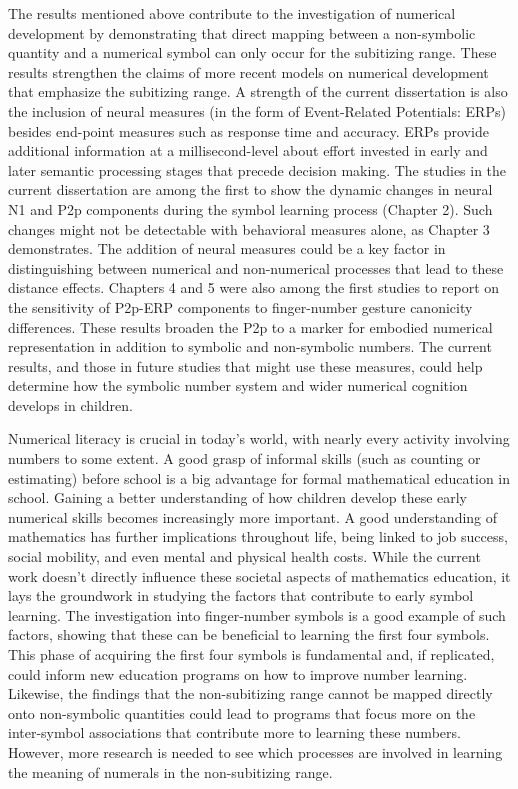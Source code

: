 \begin{refsection}
The results mentioned above contribute to the investigation of numerical development by demonstrating that direct mapping between a non-symbolic quantity and a numerical symbol can only occur for the subitizing range. These results strengthen the claims of more recent models on numerical development that emphasize the subitizing range. A strength of the current dissertation is also the inclusion of neural measures (in the form of Event-Related Potentials: ERPs) besides end-point measures such as response time and accuracy. ERPs provide additional information at a millisecond-level about effort invested in early and later semantic processing stages that precede decision making. The studies in the current dissertation are among the first to show the dynamic changes in neural N1 and P2p components during the symbol learning process (Chapter 2). Such changes might not be detectable with behavioral measures alone, as Chapter 3 demonstrates. The addition of neural measures could be a key factor in distinguishing between numerical and non-numerical processes that lead to these distance effects. Chapters 4 and 5 were also among the first studies to report on the sensitivity of P2p-ERP components to finger-number gesture canonicity differences. These results broaden the P2p to a marker for embodied numerical representation in addition to symbolic and non-symbolic numbers. The current results, and those in future studies that might use these measures, could help determine how the symbolic number system and wider numerical cognition develops in children. 

\newpage
Numerical literacy is crucial in today's world, with nearly every activity involving numbers to some extent. A good grasp of informal skills (such as counting or estimating) before school is a big advantage for formal mathematical education in school. Gaining a better understanding of how children develop these early numerical skills becomes increasingly more important. A good understanding of mathematics has further implications throughout life, being linked to job success, social mobility, and even mental and physical health costs. While the current work doesn't directly influence these societal aspects of mathematics education, it lays the groundwork in studying the factors that contribute to early symbol learning. The investigation into finger-number symbols is a good example of such factors, showing that these can be beneficial to learning the first four symbols. This phase of acquiring the first four symbols is fundamental and, if replicated, could inform new education programs on how to improve number learning. Likewise, the findings that the non-subitizing range cannot be mapped directly onto non-symbolic quantities could lead to programs that focus more on the inter-symbol associations that contribute more to learning these numbers. However, more research is needed to see which processes are involved in learning the meaning of numerals in the non-subitizing range.


\end{refsection}
